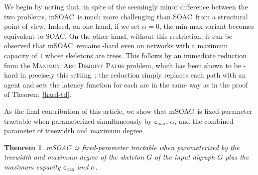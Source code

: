 \documentclass[letterpaper]{article} %
\newtheorem{theorem}{Theorem}
\newcommand{\problem}{{\sc SOAC}\xspace} %
\newcommand{\mproblem}{{\sc mSOAC}\xspace} %
\newcommand{\cmax}{\mathtt{c_{max}}}
\begin{document}
We begin by noting that, in spite of the seemingly minor difference between the two problems, \mproblem\ is much more challenging than \problem\ from a structural point of view. Indeed, on one hand, if we set $\alpha=0$, the min-max variant becomes equivalent to \problem. On the other hand, without this restriction, it can be observed that \mproblem\ remains \NP-hard even on networks with a maximum capacity of $1$ whose skeletons are trees. This follows by an immediate reduction from the \textsc{Maximum Arc Disjoint Paths} problem, which has been shown to be \NP-hard in precisely this setting~\cite{ErlebachJansen01}; the reduction simply replaces each path with an agent and sets the latency function for each arc in the same way as in the proof of Theorem~\ref{hard-td}.

As the final contribution of this article, we show that \mproblem\ is fixed-parameter tractable when parameterized simultaneously by $\cmax$, $\alpha$, and the combined parameter of treewidth and maximum degree.

\begin{theorem}
\label{thm:msoacfpt}
\mproblem\ is fixed-parameter tractable when parameterized by the treewidth and maximum degree of the skeleton $\underline{G}$ of the input digraph $G$ plus the maximum capacity $\cmax$ and $\alpha$.
\end{theorem}
\end{document}
